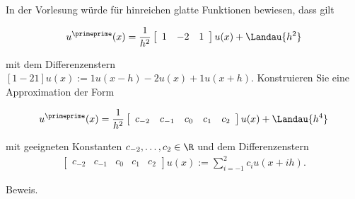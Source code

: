 \begin{exercise}
  In der Vorlesung würde für hinreichen glatte Funktionen bewiesen, dass gilt

  \begin{align*}
    u^\primeprime (x) = \frac{1}{h^2}\left[
    \begin{array}{ccc}
      1 & -2 & 1
    \end{array}
    \right] u(x) +
    \Landau{h^2}
  \end{align*}

  mit dem Differenzenstern $[1   -2   1]u(x):= 1u(x-h)-2u(x)+1u(x+h)$.
  Konstruieren Sie eine Approximation der Form

  \begin{align*}
    u^\primeprime (x) = \frac{1}{h^2} \left[
    \begin{array}{ccccc}
    c_{-2} & c_{-1} & c_0 & c_1 & c_ 2
    \end{array}
    \right]
    u(x) + \Landau{h^4}
  \end{align*}

  mit geeigneten Konstanten $c_{-2}, \dots , c_2 \in \R$ und dem Differenzenstern
  \begin{align*}
    \left[
    \begin{array}{ccccc}
        c_{-2} & c_{-1} & c_0 & c_1 & c_ 2
    \end{array}
    \right]
    u(x)
    :=
    \sum_{i=-1}^2 c_i u(x+ih).
  \end{align*}
\end{exercise}

\begin{solution}
  Beweis.
\end{solution}
